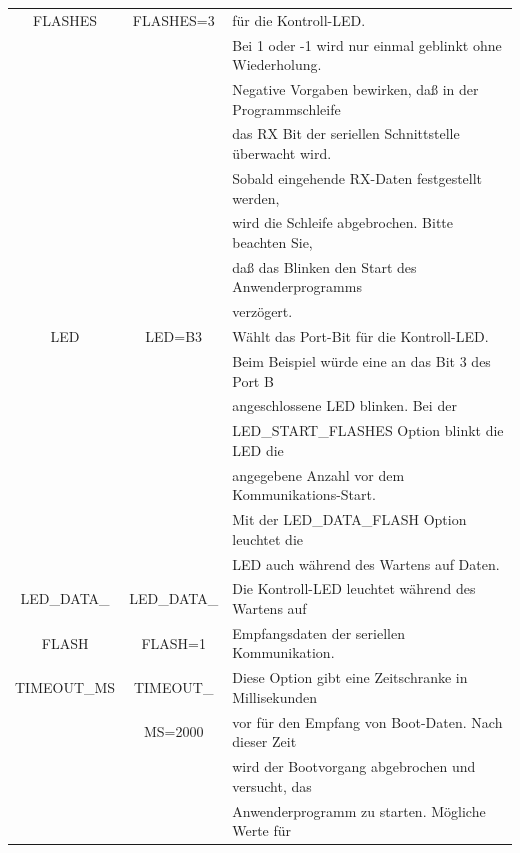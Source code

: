 \begin{table}[H]
\begin{center}
\begin{tabular}{| c | c | l |}
   FLASHES         &   FLASHES=3    & für die Kontroll-LED.                            \\
                   &                & Bei 1 oder -1 wird nur einmal geblinkt ohne Wiederholung. \\
                   &                & Negative Vorgaben bewirken, daß in der Programmschleife \\
                   &                & das RX Bit der seriellen Schnittstelle überwacht wird. \\
                   &                & Sobald eingehende RX-Daten festgestellt werden, \\
                   &                & wird die Schleife abgebrochen. Bitte beachten Sie, \\
                   &                & daß das Blinken den Start des Anwenderprogramms \\
                   &                & verzögert. \\
    \hline
 LED               & LED=B3         & Wählt das Port-Bit für die  Kontroll-LED. \\
                   &                & Beim Beispiel würde eine an das Bit 3 des Port B \\ 
                   &                & angeschlossene LED blinken. Bei der \\
                   &                & LED\_START\_FLASHES  Option  blinkt die LED die\\
                   &                & angegebene Anzahl vor dem Kommunikations-Start. \\
                   &                & Mit der LED\_DATA\_FLASH Option leuchtet die \\
                   &                & LED auch während des Wartens auf Daten. \\
    \hline
 LED\_DATA\_       & LED\_DATA\_    & Die Kontroll-LED leuchtet während des Wartens auf \\
      FLASH        &    FLASH=1     & Empfangsdaten der seriellen Kommunikation.\\
    \hline
 TIMEOUT\_MS       & TIMEOUT\_      & Diese Option gibt eine Zeitschranke in Millisekunden \\
                   &  MS=2000       & vor für den Empfang von Boot-Daten. Nach dieser Zeit\\
                   &                & wird der Bootvorgang abgebrochen und versucht, das \\
                   &                & Anwenderprogramm zu starten. Mögliche Werte für \\

\end{tabular}
\end{center}
\end{table}
